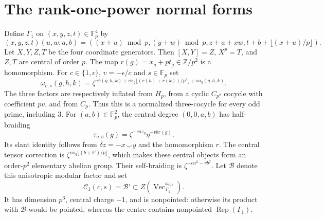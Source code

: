 \documentclass[11pt]{amsart}
\theoremstyle{definition}\newtheorem{definition}[theorem]{Definition}
\newcommand{\Fp}{\mathbb F_p}
\renewcommand{\Vec}{\operatorname{Vec}}
\newcommand{\Rep}{\operatorname{Rep}}
\newcommand{\cB}{\mathcal B}
\newcommand{\cC}{\mathcal C}
\begin{document}
\section{The rank-one-power normal forms}
Define $\Gamma_1$ on $(x,y,z,t)\in\Fp^4$ by
\[
(x,y,z,t)(u,w,a,b)=
((x+u)\bmod p,(y+w)\bmod p,z+a+xw,t+b+\lfloor(x+u)/p\rfloor).
\]
Let $X,Y,Z,T$ be the four coordinate generators. Then $[X,Y]=Z$,
$X^p=T$, and $Z,T$ are central of order $p$.
The map $r(g)=x_g+pt_g\in\mathbb Z/p^2$ is a homomorphism.
For $c\in\{1,\epsilon\}$, $v=-\epsilon/c$ and $s\in\Fp$ set
\begin{equation}\label{eq:prime-omega}
\omega_{c,s}(g,h,k)=\zeta^{c\phi(g,h,k)
+v x_g\lfloor(r(h)+r(k))/p^2\rfloor+s a_y(g,h,k)}.
\end{equation}
The three factors are respectively inflated from $H_p$, from a cyclic
$C_{p^2}$ cocycle with coefficient $pv$, and from $C_p$. Thus this is a
normalized three-cocycle for every odd prime, including $3$.
For $(a,b)\in\Fp^2$, the central degree $(0,0,a,b)$ has half-braiding
\begin{equation}\label{eq:tau-prime}
\tau_{a,b}(g)=\zeta^{-ca z_g}\eta^{-vb r(g)}.
\end{equation}
Its slant identity follows from $\delta z=-x\smile y$ and the homomorphism $r$.
The central tensor correction is
$\zeta^{v x_g\lfloor(b+b')/p\rfloor}$, which makes these central objects
form an order-$p^2$ elementary abelian group. Their self-braiding is
$\zeta^{-ca^2-vb^2}$. Let $\cB$ denote this anisotropic modular factor and set
\[
\cC_1(c,s)=\cB'\subset Z(\Vec_{\Gamma_1}^{\omega_{c,s}}).
\]
It has dimension $p^6$, central charge $-1$, and is nonpointed: otherwise its
product with $\cB$ would be pointed, whereas the centre contains
nonpointed $\Rep(\Gamma_1)$.
\end{document}
